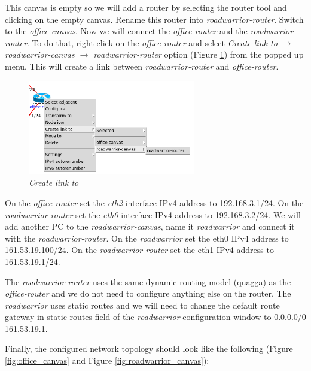 This canvas is empty so we will add a router by selecting the router tool and
clicking on the empty canvas. Rename this router into
\emph{roadwarrior-router}. Switch to the \emph{office-canvas}.  Now we will
connect the \emph{office-router} and the \emph{roadwarrior-router}. To do that,
right click on the \emph{office-router} and select \emph{Create link to $\to$
roadwarrior-canvas $\to$ roadwarrior-router} option (Figure
\ref{fig:create_link_to}) from the popped up menu. This will create a link
between \emph{roadwarrior-router} and \emph{office-router}.
\begin{figure}[H]
    \centering
    \vspace{10pt}
    \includegraphics[width=0.65\textwidth]{./images/create_link_to.png}
    \caption{\emph{Create link to}}
    \label{fig:create_link_to}
\end{figure}

On the \emph{office-router} set the \emph{eth2} interface IPv4 address to
192.168.3.1/24. On the \emph{roadwarrior-router} set the \emph{eth0} interface
IPv4 address to 192.168.3.2/24.  We will add another PC to the
\emph{roadwarrior-canvas}, name it \emph{roadwarrior} and connect it with the
\emph{roadwarrior-router}. On the \emph{roadwarrior} set the eth0 IPv4 address
to 161.53.19.100/24. On the \emph{roadwarrior-router} set the eth1 IPv4 address
to 161.53.19.1/24.

The \emph{roadwarrior-router} uses the same dynamic routing model (quagga) as
the \emph{office-router} and we do not need to configure anything else on the
router. The \emph{roadwarrior} uses static routes and we will need to change
the default route gateway in static routes field of the \emph{roadwarrior}
configuration window to 0.0.0.0/0 161.53.19.1.

Finally, the configured network topology should look like the following (Figure
\ref{fig:office_canvas} and Figure \ref{fig:roadwarrior_canvas}):

